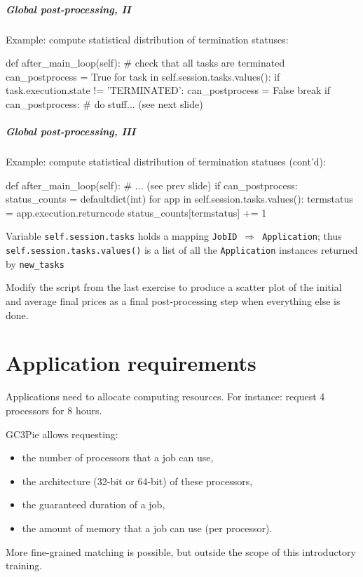 \documentclass[english,serif,mathserif,xcolor=pdftex,dvipsnames,table]{beamer}
\begin{document}
\begin{frame}[fragile]
  \frametitle{Global post-processing, II}
  Example: compute statistical distribution of termination statuses:

  \begin{python}
def after_main_loop(self):
  # check that all tasks are terminated
  can_postprocess = True
  for task in self.session.tasks.values():
    if task.execution.state != 'TERMINATED':
      can_postprocess = False
      break
  if can_postprocess:
    # do stuff... (see next slide)
  \end{python}
\end{frame}


\begin{frame}[fragile]
  \frametitle{Global post-processing, III}
  Example: compute statistical distribution of termination statuses (cont'd):

  \begin{python}
def after_main_loop(self):
  # ... (see prev slide)
  if can_postprocess:
    status_counts = defaultdict(int)
    for app in self.session.tasks.values():
      termstatus = app.execution.returncode
      status_counts[termstatus] += 1
  \end{python}

  \+\small Variable \lstinline|self.session.tasks| holds a mapping
  \lstinline|JobID|~$\Rightarrow$~\lstinline|Application|; thus
  \lstinline|self.session.tasks.values()| is a list of all the
  \texttt{Application} instances returned by \lstinline|new_tasks|
\end{frame}


\begin{frame}
  \begin{exercise*}[10.H]
    Modify the script from the last exercise to produce a scatter plot of the
    initial and average final prices as a final post-processing step when
    everything else is done.
  \end{exercise*}
\end{frame}


\part{Application requirements}

\begin{frame}
  Applications need to allocate computing resources.
  For instance: request 4 processors for 8 hours.

  \+
  GC3Pie allows requesting:
  \begin{itemize}
  \item the number of processors that a job can use,
  \item the architecture (32-bit or 64-bit) of these processors,
  \item the guaranteed duration of a job,
  \item the amount of memory that a job can use (per processor).
  \end{itemize}

  \+
  More fine-grained matching is possible, but outside the scope of
  this introductory training.
\end{frame}
\end{document}
